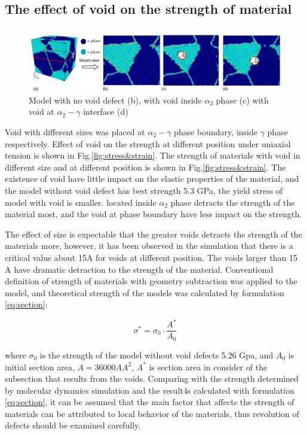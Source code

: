 \documentclass[metals,article,submit,moreauthors,pdftex,10pt,a4paper]{Definitions/mdpi}
\begin{document}
\subsection{The effect of void on the strength of material}

\begin{figure}[ht]
	\centering
	\includegraphics[width=1\linewidth]{img/models}
	\caption{ Model with no void defect (b), with void inside $\alpha_2$ phase (c) with void at $\alpha_2-\gamma$ interface (d)}
	\label{fig:model-creation}
\end{figure}

Void with different sizes was placed at $\alpha_2-\gamma$ phase boundary, inside $\gamma$ phase respectively. Effect of void on the strength at different position under uniaxial tension is shown in Fig.\ref{fig:stress&strain}. The strength of materials with void in different size and at different position is shown in Fig.\ref{fig:stress&strain}. The existence of void have little impact on the elastic properties of the material, and the model without void defect has best strength 5.3 GPa, the yield stress of model with void is smaller. located inside $\alpha_2$ phase detracts the strength of the material most, and the void at phase boundary have less impact on the strength.
           
The effect of size is expectable that the greater voids detracts the strength of the materials more, however, it has been observed in the simulation that there is a critical value about 15A for voids at different position. The voids larger than 15 A have dramatic detraction to the strength of the material. Conventional definition of strength of materials with geometry subtraction was applied to the model, and theoretical strength of the models was calculated by formulation \ref{eq:section}:
	
	\begin{equation} \label{eq:section} 
	\sigma^* = \sigma_0 \cdot \frac{A^*}{A_0}
	\end{equation}
	
where $\sigma_0$ is the strength of the model without void defects 5.26 Gpa, and $A_0$ is initial section area, $ A = 36000 {AA}^2$, $A^* $ is section area in consider of the subsection that results from the voids. Comparing with the strength determined by molecular dynamics simulation and the result4s calculated with formulation \ref{eq:section}, it can be assumed that the main factor that affects the strength of materials can be attributed to local behavior of the materials, thus revolution of defects should be examined carefully.
\end{document}

